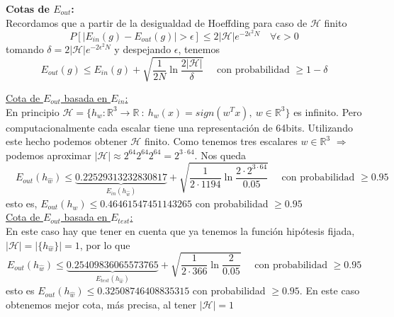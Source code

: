 \documentclass[11pt,a4paper]{article}
\theoremstyle{definition}
\newcommand{\R}{\mathbb{R}}
\begin{document}
	\textbf{Cotas de $E_{out}$:}\\
	Recordamos que a partir de la desigualdad de Hoeffding para caso de $\mathcal{H}$ finito
	$$P[ |E_{in}(g)-E_{out}(g)|>\epsilon]\leq 2 | \mathcal{H} | e^{-2\epsilon ^2N} \quad \forall \epsilon >0$$
	tomando $\delta =2|\mathcal{H}|e^{-2\epsilon ^2 N}$ y despejando $\epsilon$, tenemos
	$$E_{out}(g)\leq E_{in}(g)+\sqrt{\frac{1}{2N} \ln \frac{2|\mathcal{H}|}{\delta}}\quad \text{ con probabilidad } \geq 1-\delta$$
	
	\underline{Cota de $E_{out}$ basada en $E_{in}$:}\\
	En principio $\mathcal{H}=\{h_w\colon \R^{3} \to \R \ : \ h_w(x) = sign(w^Tx), \ w \in \R^{3}\}$ es infinito. Pero computacionalmente cada escalar tiene una representación de 64bits. Utilizando este hecho podemos obtener $\mathcal{H}$ finito. Como tenemos tres escalares $w\in \R^3$ $\Rightarrow$ podemos aproximar $|\mathcal{H}|\approx 2^{64}2^{64}2^{64}=2^{3\cdot 64}$. Nos queda 
	$$\quad E_{out}(h_{\hat w})\leq \underbrace{0.22529313232830817}_{E_{in}(h_{\hat w})} + \sqrt{\frac{1}{2\cdot 1194} \ln \frac{2\cdot 2^{3\cdot 64}}{0.05}} \quad \text{ con probabilidad } \geq 0.95$$
	esto es, $E_{out}(h_{\hat w})\leq 0.46461547451143265$ con probabilidad $\geq 0.95$\\
	
	\underline{Cota de $E_{out}$ basada en $E_{test}$:}\\
	En este caso hay que tener en cuenta que ya tenemos la función hipótesis fijada, $|\mathcal{H}|=|\{h_{\hat w}\}|=1$, por lo que 
	$$E_{out}(h_{\hat w})\leq \underbrace{0.25409836065573765}_{E_{test}(h_{\hat w})} + \sqrt{\frac{1}{2\cdot 366} \ln \frac{2}{0.05}} \quad \text{ con probabilidad } \geq 0.95$$
	esto es $E_{out}(h_{\hat w}) \leq 0.32508746408835315$ con probabilidad $\geq 0.95$. En este caso obtenemos mejor cota, más precisa, al tener $|\mathcal{H}|=1$
	
\end{document}
